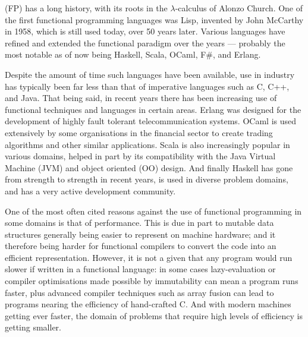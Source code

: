  (FP) has a long history, with its roots in the $\lambda$-calculus of Alonzo Church. One of the first functional programming languages was Lisp, invented by John McCarthy in 1958, which is still used today, over 50 years later. Various languages have refined and extended the functional paradigm over the years --- probably the most notable as of now being Haskell, Scala, OCaml, F\#, and Erlang.

Despite the amount of time such languages have been available, use in industry has typically been far less than that of imperative languages such as C, C++, and Java. That being said, in recent years there has been increasing use of functional techniques and languages in certain areas. Erlang was designed for the development of highly fault tolerant telecommunication systems.\cite[-1em]{armstrong2007history} OCaml is used extensively by some organisations in the financial sector to create trading algorithms and other similar applications. Scala is also increasingly popular in various domains, helped in part by its compatibility with the Java Virtual Machine (JVM) and object oriented (OO) design. And finally Haskell has gone from strength to strength in recent years, is used in diverse problem domains, and has a very active development community.

One of the most often cited reasons against the use of functional programming in some domains is that of performance. This is due in part to mutable data structures generally being easier to represent on machine hardware; and it therefore being harder for functional compilers to convert the code into an efficient representation. However, it is not a given that any program would run slower if written in a functional language: in some cases lazy-evaluation or compiler optimisations made possible by immutability can mean a program runs faster, plus advanced compiler techniques such as array fusion can lead to programs nearing the efficiency of hand-crafted C.\cite[-3em]{mainlandhaskell} And with modern machines getting ever faster, the domain of problems that require high levels of efficiency is getting smaller.


